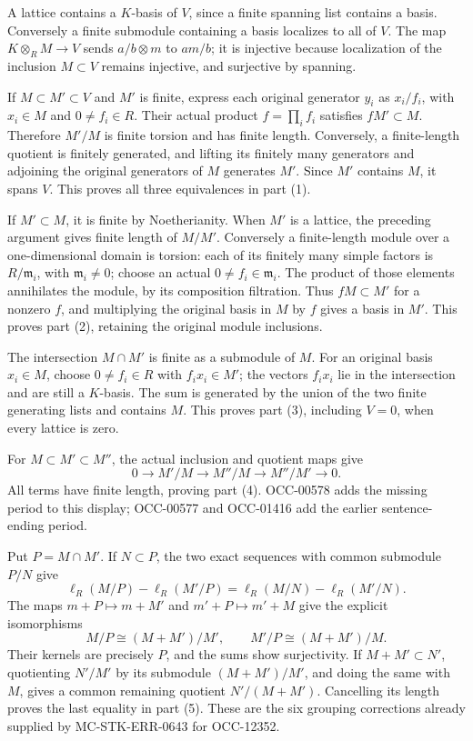 A lattice contains a \(K\)-basis of \(V\), since a finite spanning list contains a basis. Conversely a finite submodule containing a basis localizes to all of \(V\). The map \(K\otimes_R M\to V\) sends \(a/b\otimes m\) to \(am/b\); it is injective because localization of the inclusion \(M\subset V\) remains injective, and surjective by spanning.

If \(M\subset M'\subset V\) and \(M'\) is finite, express each original generator \(y_i\) as \(x_i/f_i\), with \(x_i\in M\) and \(0\ne f_i\in R\). Their actual product \(f=\prod_i f_i\) satisfies \(fM'\subset M\). Therefore \(M'/M\) is finite torsion and has finite length. Conversely, a finite-length quotient is finitely generated, and lifting its finitely many generators and adjoining the original generators of \(M\) generates \(M'\). Since \(M'\) contains \(M\), it spans \(V\). This proves all three equivalences in part (1).

If \(M'\subset M\), it is finite by Noetherianity. When \(M'\) is a lattice, the preceding argument gives finite length of \(M/M'\). Conversely a finite-length module over a one-dimensional domain is torsion: each of its finitely many simple factors is \(R/\mathfrak m_i\), with \(\mathfrak m_i\ne0\); choose an actual \(0\ne f_i\in\mathfrak m_i\). The product of those elements annihilates the module, by its composition filtration. Thus \(fM\subset M'\) for a nonzero \(f\), and multiplying the original basis in \(M\) by \(f\) gives a basis in \(M'\). This proves part (2), retaining the original module inclusions.

The intersection \(M\cap M'\) is finite as a submodule of \(M\). For an original basis \(x_i\in M\), choose \(0\ne f_i\in R\) with \(f_ix_i\in M'\); the vectors \(f_ix_i\) lie in the intersection and are still a \(K\)-basis. The sum is generated by the union of the two finite generating lists and contains \(M\). This proves part (3), including \(V=0\), when every lattice is zero.

For \(M\subset M'\subset M''\), the actual inclusion and quotient maps give \[
 0\longrightarrow M'/M\longrightarrow M''/M
   \longrightarrow M''/M'\longrightarrow0.
\] All terms have finite length, proving part (4). OCC-00578 adds the missing period to this display; OCC-00577 and OCC-01416 add the earlier sentence-ending period.

Put \(P=M\cap M'\). If \(N\subset P\), the two exact sequences with common submodule \(P/N\) give \[
 \ell_R(M/P)-\ell_R(M'/P)
 =\ell_R(M/N)-\ell_R(M'/N).
\] The maps \(m+P\mapsto m+M'\) and \(m'+P\mapsto m'+M\) give the explicit isomorphisms \[
 M/P\cong(M+M')/M',\qquad M'/P\cong(M+M')/M.
\] Their kernels are precisely \(P\), and the sums show surjectivity. If \(M+M'\subset N'\), quotienting \(N'/M'\) by its submodule \((M+M')/M'\), and doing the same with \(M\), gives a common remaining quotient \(N'/(M+M')\). Cancelling its length proves the last equality in part (5). These are the six grouping corrections already supplied by MC-\AlgebraIdentifierBreak{}STK-\AlgebraIdentifierBreak{}ERR-\AlgebraIdentifierBreak{}0643 for OCC-12352.


